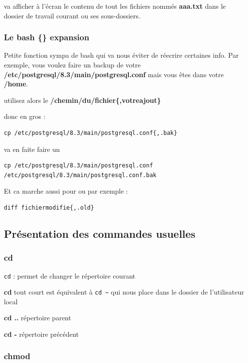 \documentclass[a4paper,twoside]{article}
\begin{document}
va afficher à l'écran le contenu de tout les fichiers nommés \textbf{aaa.txt} dans le dossier de travail courant ou ses sous-dossiers.

\subsubsection{Le bash \{\} expansion}

Petite fonction sympa de bash qui va nous éviter de réecrire certaines info. Par exemple, vous voulez faire un backup de votre \textbf{/etc/postgresql/8.3/main/postgresql.conf} mais vous êtes dans votre \textbf{/home}.

utilisez alors le \textbf{/chemin/du/fichier\{,votreajout\}}

donc en gros :

\begin{verbatim}
cp /etc/postgresql/8.3/main/postgresql.conf{,.bak}
\end{verbatim}

va en faite faire un
\begin{small}\begin{verbatim}
cp /etc/postgresql/8.3/main/postgresql.conf /etc/postgresql/8.3/main/postgresql.conf.bak
\end{verbatim}\end{small}



Et ca marche aussi pour  ou  par exemple :

\begin{verbatim}
diff fichiermodifie{,.old}
\end{verbatim}



\subsection{Présentation des commandes usuelles}

\subsubsection{cd}
\verb|cd| : permet de changer le répertoire courant

\textbf{cd} tout court est équivalent à \verb|cd ~|  qui nous place dans le dossier de l'utilisateur local

\textbf{cd ..} répertoire parent

\textbf{cd -} répertoire précédent

\subsubsection{chmod}
\end{document}
